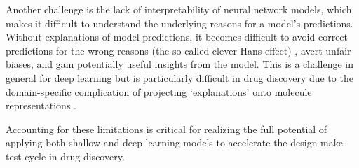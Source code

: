 Another challenge is the lack of interpretability of neural network models, which makes it difficult to understand the underlying reasons for a model's predictions. Without explanations of model predictions, it becomes difficult to avoid correct predictions for the wrong reasons (the so-called clever Hans effect) \cite{Lapuschkin2019UnmaskingCleverHans}, avert unfair biases, and gain potentially useful insights from the model. This is a challenge in general for deep learning but is particularly difficult in drug discovery due to the domain-specific complication of projecting `explanations' onto molecule representations \cite{Jimenze2020XAI}.

Accounting for these limitations is critical for realizing the full potential of applying both shallow and deep learning models to accelerate the design-make-test cycle in drug discovery.